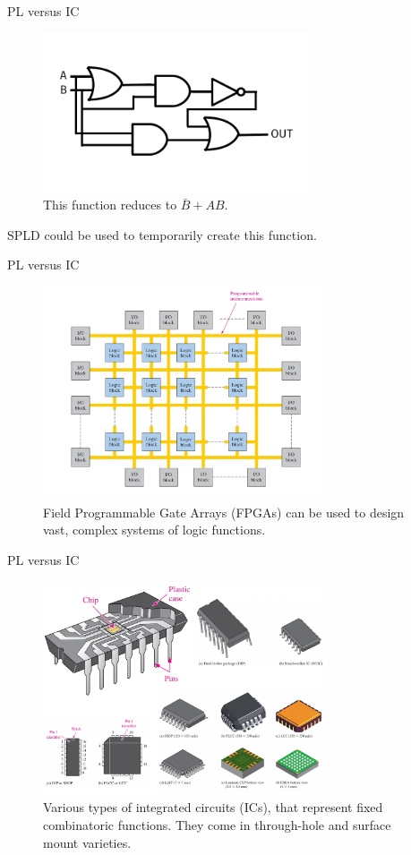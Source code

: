 \documentclass{beamer}
\begin{document}
\begin{frame}{PL versus IC}
\begin{figure}
\includegraphics[width=0.7\textwidth]{operators2.pdf}
\caption{\label{fig:PL2a} This function reduces to $\bar{B} + AB$.}
\end{figure}
SPLD could be used to temporarily create this function.
\end{frame}

\begin{frame}{PL versus IC}
\small
\begin{figure}
\includegraphics[width=0.75\textwidth]{PL3.pdf}
\caption{\label{fig:PL3} Field Programmable Gate Arrays (FPGAs) can be used to design vast, complex systems of logic functions.}
\end{figure}
\end{frame}

\begin{frame}{PL versus IC}
\small
\begin{figure}
\includegraphics[width=0.75\textwidth]{PL4.pdf}
\caption{\label{fig:PL4} Various types of integrated circuits (ICs), that represent fixed combinatoric functions.  They come in through-hole and surface mount varieties.}
\end{figure}
\end{frame}
\end{document}
